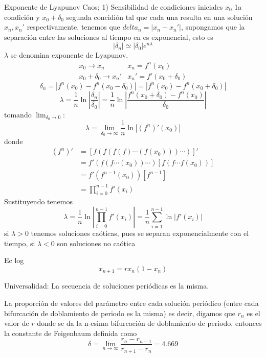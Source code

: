 Exponente de Lyapunov
Caos; 1) Sensibilidad de condiciones iniciales
$x_0$ 1a condición y $x_0+\delta_0$ segunda concidión tal que cada una resulta en una solución $x_n,x_n'$ respectivamente, tenemos que  $delta_n = \left| x_n - x_n' \right| $, supongamos que la separación entre las soluciones al tiempo en es exponencial, esto es
\begin{equation*}
  \left| \delta_n \right| \simeq \left| \delta_0 \right| e^{n \lambda}  
\end{equation*}
$\lambda$ se denomina exponente de Lyapunov.
\begin{align*}
  x_0 \to x_n & x_n = f^{n}(x_0) \\
  x_0+\delta_0 \to x_n' & x_n' = f'(x_0+\delta_0)
\end{align*}
\begin{equation*}
  \delta_n = \left| f^{n}(x_0)-f^{n}(x_0-\delta_0) \right|  = \left| f^{n}(x_0)-f^{n}(x_0+\delta_0) \right| 
\end{equation*}
\begin{equation*}
  \lambda = \frac{1}{n} \ln \left| \frac{\delta_n}{\delta_0} \right| = \frac{1}{n} \ln \left| \frac{f^{n}(x_0+\delta_0)-f^n (x_0)}{\delta_0} \right|  
\end{equation*}
tomando $\lim_{\delta_0 \to 0} $:
\begin{equation*}
  \lambda = \lim_{\delta_0 \to \infty} \frac{1}{n} \ln \left| \left( f^{n} \right)' (x_0) \right|  
\end{equation*}
donde
\begin{equation*}
  \begin{split}
    (f^{n})' &= [f(f(f(f)\cdots (f(x_0)))\cdots)]' \\
             &= f'(f(f\cdots(x_0))\cdots)[f(f \cdots f(x_0))] \\
             &= f'(f^{n-1}(x_0))[f^{n-1}] \\
             &= \prod_{i=0}^{n-1} f'(x_i) 
  \end{split}
\end{equation*}
Sustituyendo tenemos
\begin{equation*}
  \lambda = \frac{1}{n} \ln \left| \prod_{i=0}^{n-1} f'(x_i)   \right|  = \frac{1}{n} \sum_{i=1}^{n-1} \ln \left| f'(x_i) \right|   
\end{equation*}
si $\lambda>0$ tenemos soluciones caóticas, pues se separan exponencialmente con el tiempo, si $\lambda<0$ son soluciones no caótica

Ec log
\begin{equation*}
  x_{n+1}=rx_n(1-x_n) 
\end{equation*}

Universalidad: La secuencia de soluciones periódicas es la misma.

La proporción de valores del parámetro entre cada solución periódico (entre cada bifurcación de doblamiento de periodo es la misma) es decir, digamos que $r_n$ es el valor de  $r$ donde se da la  n-esima bifurcación de doblamiento de periodo, entonces la constante de Feigenbaum definida como
 \begin{equation*}
  \delta = \lim_{n \to \infty} \frac{r_n - r_{n-1}}{r_{n+1}-r_n} = 4.669 
\end{equation*}


